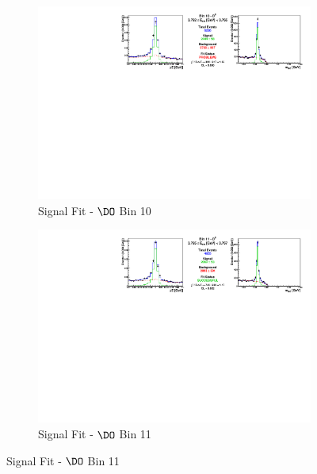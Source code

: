 \begin{figure}[h]

\begin{subfigure}[c]{0.99\textwidth}
\includegraphics[width=\textwidth]{figures/plots/fit_results/D0_bin_10.pdf}
\caption*{Signal Fit - $\DO$ Bin 10}
\end{subfigure}

\vspace{5pt}

\begin{subfigure}[c]{0.99\textwidth}
\includegraphics[width=\textwidth]{figures/plots/fit_results/D0_bin_11.pdf}
\caption*{Signal Fit - $\DO$ Bin 11}
\end{subfigure}

\vspace{5pt}


\end{figure}
